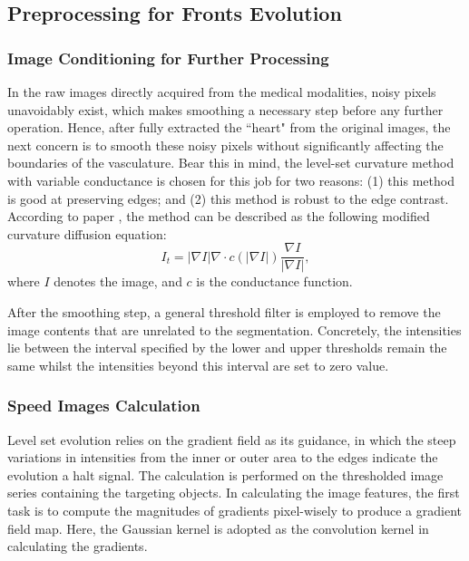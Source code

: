 \subsection{Preprocessing for Fronts Evolution}
\label{subsec:coronary_preprocessing}

\subsubsection{Image Conditioning for Further Processing}
\label{subsubsec:coronary_condition}

In the raw images directly acquired from the medical modalities, noisy pixels unavoidably exist, which makes smoothing a necessary step before any further operation.
Hence, after fully extracted the ``heart" from the original images, the next concern is to smooth these noisy pixels without significantly affecting the boundaries of the vasculature. %
Bear this in mind, the level-set curvature method with variable conductance \cite{Whitaker2001} is chosen for this job for two reasons: (1) this method is good at preserving edges; and (2) this method is robust to the edge contrast.
According to paper \cite{Whitaker2001}, the method can be described as the following modified curvature diffusion equation:
\begin{equation}
\label{eqn:coronary_MCDE}
I_t = |\nabla I| \nabla \cdot c(|\nabla I|) \frac{\nabla I}{|\nabla I|},
\end{equation}
where $I$ denotes the image, and $c$ is the conductance function. %

After the smoothing step, a general threshold filter is employed to remove the image contents that are unrelated to the segmentation.
Concretely, the intensities lie between the interval specified by the lower and upper thresholds remain the same whilst the intensities beyond this interval are set to zero value. %

\subsubsection{Speed Images Calculation}
\label{subsubsec:coronary_speed_image}

Level set evolution relies on the gradient field as its guidance, in which the steep variations in intensities from the inner or outer area to the edges indicate the evolution a halt signal.
The calculation is performed on the thresholded image series containing the targeting objects.
In calculating the image features, the first task is to compute the magnitudes of gradients pixel-wisely to produce a gradient field map.
Here, the Gaussian kernel is adopted as the convolution kernel in calculating the gradients.

